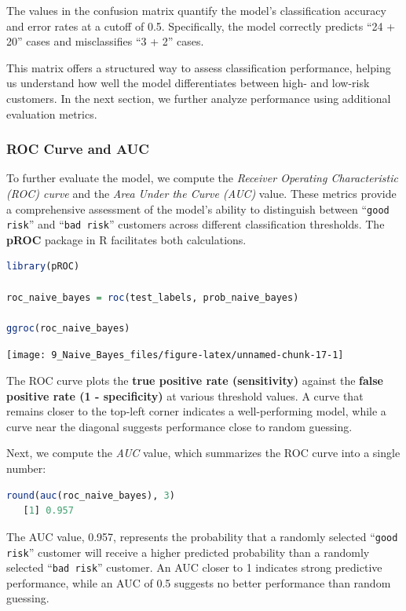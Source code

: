 \documentclass[
  11pt,
]{book}
\newcommand{\passthrough}[1]{#1}
\theoremstyle{definition}
\theoremstyle{definition}
\theoremstyle{definition}
\theoremstyle{definition}
\theoremstyle{remark}
\begin{document}
The values in the confusion matrix quantify the model's classification accuracy and error rates at a cutoff of 0.5. Specifically, the model correctly predicts ``24 + 20'' cases and misclassifies ``3 + 2'' cases.

This matrix offers a structured way to assess classification performance, helping us understand how well the model differentiates between high- and low-risk customers. In the next section, we further analyze performance using additional evaluation metrics.

\subsubsection*{ROC Curve and AUC}\label{roc-curve-and-auc-1}


To further evaluate the model, we compute the \emph{Receiver Operating Characteristic (ROC) curve} and the \emph{Area Under the Curve (AUC)} value. These metrics provide a comprehensive assessment of the model's ability to distinguish between ``\passthrough{\lstinline!good risk!}'' and ``\passthrough{\lstinline!bad risk!}'' customers across different classification thresholds. The \textbf{pROC} package in R facilitates both calculations.

\begin{lstlisting}[language=R]
library(pROC)          

roc_naive_bayes = roc(test_labels, prob_naive_bayes)

ggroc(roc_naive_bayes)
\end{lstlisting}

\begin{center}\texttt{[image: 9\_Naive\_Bayes\_files/figure-latex/unnamed-chunk-17-1]} \end{center}

The ROC curve plots the \textbf{true positive rate (sensitivity)} against the \textbf{false positive rate (1 - specificity)} at various threshold values. A curve that remains closer to the top-left corner indicates a well-performing model, while a curve near the diagonal suggests performance close to random guessing.

Next, we compute the \emph{AUC} value, which summarizes the ROC curve into a single number:

\begin{lstlisting}[language=R]
round(auc(roc_naive_bayes), 3)
   [1] 0.957
\end{lstlisting}

The AUC value, 0.957, represents the probability that a randomly selected ``\passthrough{\lstinline!good risk!}'' customer will receive a higher predicted probability than a randomly selected ``\passthrough{\lstinline!bad risk!}'' customer. An AUC closer to 1 indicates strong predictive performance, while an AUC of 0.5 suggests no better performance than random guessing.
\end{document}
